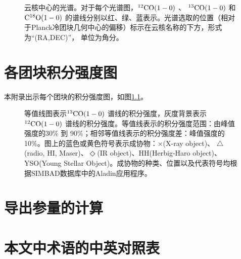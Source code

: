 \documentclass[UTF8, nocolorlinks]{pkuthss}
\newcommand{\coaa}{$\rm^{12}CO(1-0)$ }
\newcommand{\cobb}{$\rm^{13}CO(1-0)$ }
\newcommand{\cocc}{$\rm C^{18}O(1-0)$ }
\begin{document}
	\begin{figure}[h]
		\caption{云核中心的光谱。对于每个光谱图，\coaa 、 \cobb 和 \cocc   的谱线分别以红、绿、蓝表示。光谱选取的位置（相对于Planck冷团块几何中心的偏移）标示在云核名称的下方，形式为“(RA,DEC)”， 单位为角分。\label{Fig.Spectra}}
	\end{figure}
		\vspace{-18mm}

\chapter{各团块积分强度图}\label{App.Map}
	
	本附录出示每个团块的积分强度图，如图\ref{Fig.Map}。

	\begin{figure}[h]
		\caption{等值线图表示\cobb 谱线的积分强度，灰度背景表示\coaa 谱线的积分强度。等值线表示的积分强度范围：由峰值强度的30\% 到 90\%；相邻等值线表示的积分强度差：峰值强度的10\%。图上的蓝色或黄色符号表示成协物：$\times$(X-ray object)、 $\triangle$(radio, {HI}, Maser)、$\Diamond$(IR object)、HH(Herbig-Haro object)、YSO(Young Stellar Object)。成协物的种类、位置以及代表符号均根据SIMBAD数据库中的Aladin应用程序。\label{Fig.Map}}
	\end{figure}
		\vspace{-18mm}

\chapter{导出参量的计算}

\chapter{本文中术语的中英对照表}
\backmatter


\end{document}
